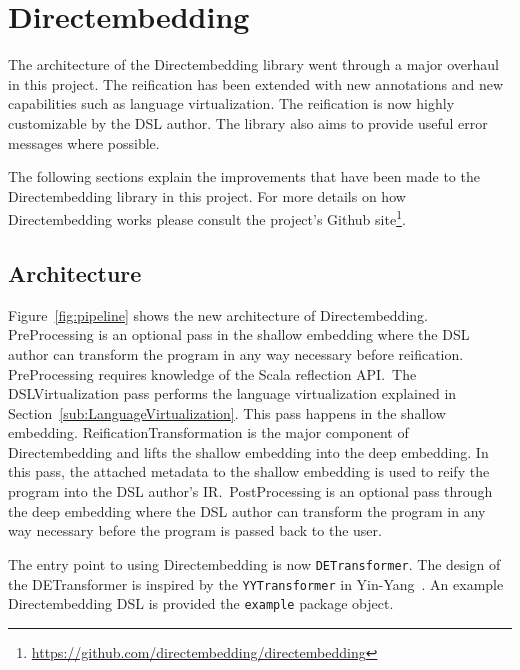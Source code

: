 \section{Directembedding} %
\label{sec:Directembedding}
The architecture of the Directembedding library went through a major overhaul in this project.
The reification has been extended with new annotations and new capabilities such as language virtualization.
The reification is now highly customizable by the DSL author.
The library also aims to provide useful error messages where possible.

The following sections explain the improvements that have been made to the Directembedding library in this project.
For more details on how Directembedding works please consult the project's Github site\footnote{\href{https://github.com/directembedding/directembedding}{https://github.com/directembedding/directembedding}}.

\subsection{Architecture} %
\label{sub:Architecture}
Figure~\ref{fig:pipeline} shows the new architecture of Directembedding.
PreProcessing is an optional pass in the shallow embedding where the DSL author can transform the program in any way necessary before reification.
PreProcessing requires knowledge of the Scala reflection API.\
The DSLVirtualization pass performs the language virtualization explained in Section~\ref{sub:LanguageVirtualization}.
This pass happens in the shallow embedding.
ReificationTransformation is the major component of Directembedding and lifts the shallow embedding into the deep embedding.
In this pass, the attached metadata to the shallow embedding is used to reify the program into the DSL author's IR.\
PostProcessing is an optional pass through the deep embedding where the DSL author can transform the program in any way necessary before the program is passed back to the user.


The entry point to using Directembedding is now \texttt{DETransformer}.
The design of the DETransformer is inspired by the \texttt{YYTransformer} in Yin-Yang~\autocite{jovanovic_yin-yang:_2014}.
An example Directembedding DSL is provided the \texttt{example} package object.

